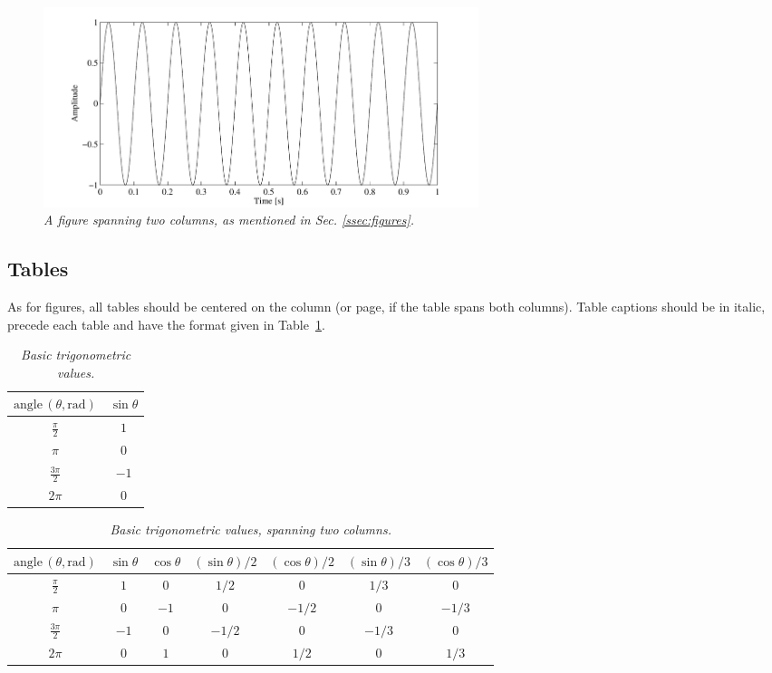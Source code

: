 \documentclass[a4paper]{article}
\begin{document}
\begin{figure}[ht]
\center
\includegraphics[width=5in]{figures/TwoColumnSine2/TwoColumnSine2}
\caption{\label{ftt_plot2}{\it A figure spanning two columns, as mentioned in
Sec. \ref{ssec:figures}.}}
\end{figure}

\subsection{Tables}

As for figures, all tables should be centered on the column (or page, if the
table spans both columns). Table captions should be in italic, precede each
table and have the format given in Table~\ref{tab:example}.

\begin{table}[ht]
  \caption{\itshape Basic trigonometric values.}
	\centering
	\begin{tabular}{|c|c|}
		\hline
		$\mathrm{angle}\,(\theta, \mathrm{rad})$ & $\sin \theta$ \\\hline
		$\frac{\pi}{2}$ & $1$ \\
		$\pi$ & $0$ \\
		$\frac{3\pi}{2}$ & $-1$ \\
		$2\pi$ & $0$ \\\hline
	\end{tabular}
	\label{tab:example}
\end{table}

\begin{table}[ht]
  \caption{{\it Basic trigonometric values, spanning two columns.}}
	\centering
  \begin{tabular}{|c|c|c|c|c|c|c|}\hline
    $\mathrm{angle}\, (\theta, \mathrm{rad})$ & $\sin \theta$ & $\cos \theta $ & $(\sin \theta)/2 $ & $(\cos \theta) /2 $ & $(\sin \theta)/3 $ & $(\cos \theta)/3$    \\\hline
    $\frac{\pi}{2}$ & $1$ & $0$ & $1/2$ & $0$ & $1/3$ & $0$ \\
    $\pi$ & $0$ & $-1$ & $0$ & $-1/2$ & $0$ & $-1/3$\\
    $\frac{3\pi}{2}$ & $-1$ & $0$ & $-1/2$ & $0$ & $-1/3$ & $0$ \\
    $2\pi$ & $0$ & $1$ & $0$ & $1/2$ & $0$ & $1/3$ \\\hline
 \end{tabular}
  \label{tab:example2}
\end{table}
\end{document}

